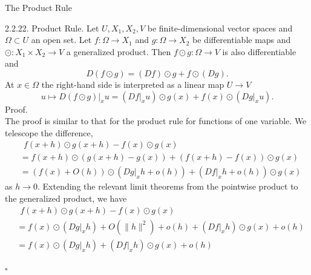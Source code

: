 \documentclass[smaller,hyperref={CJKbookmarks=true}]{beamer}
\begin{document}
\begin{frame}{The Product Rule}
\begin{spacing}{0.9}
\vspace*{23pt}
\alert{2.2.22. Product Rule.} Let $U,X_1,X_2,V$ be finite-dimensional vector spaces and $\Omega\subset U$ an open set. Let $f:\Omega\to X_1$ and $g:\Omega\to X_2$ be dif{}ferentiable maps and $\odot:X_1\times X_2\to V$ a generalized product. Then $f\odot g:\Omega\to V$ is also dif{}ferentiable and
\begin{equation}\label{2.2.2}
  D(f\odot g)=(Df)\odot g+f\odot(Dg).
\end{equation}
At $x\in\Omega$ the right-hand side is interpreted as a linear map $U\to V$
\begin{equation}\label{2.2.3}
  u\mapsto D(f\odot g)|_xu=(Df|_xu)\odot g(x)+f(x)\odot(Dg|_xu).
\end{equation}
\newpage
\alert{Proof.}\\
The proof is similar to that for the product rule for functions of one
variable. We telescope the dif{}ference,
\begin{equation*}
  \begin{split}
       &~~f(x+h)\odot g(x+h)-f(x)\odot g(x)  \\
       &=f(x+h)\odot (g(x+h)-g(x))+(f(x+h)-f(x))\odot g(x)  \\
       &=(f(x)+O(h))\odot(Dg|_xh+o(h))+(Df|_xh+o(h))\odot g(x)
  \end{split}
\end{equation*}
as $h\to0$. Extending the relevant limit theorems from the pointwise
product to the generalized product, we have
\begin{equation*}
  \begin{split}
       &~~f(x+h)\odot g(x+h)-f(x)\odot g(x)  \\
       &=f(x)\odot (Dg|_xh)+O(\|h\|^2)+o(h)+(Df|_xh)\odot g(x)+o(h)  \\
       &=f(x)\odot(Dg|_xh)+(Df|_xh)\odot g(x)+o(h)
  \end{split}
\end{equation*}
\begin{flushright}
  $\square$
\end{flushright}
\end{spacing}
\end{frame}
\end{document}
